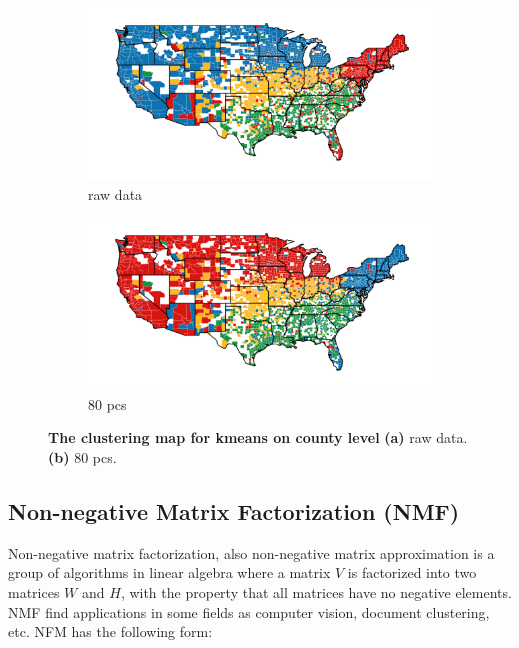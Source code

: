 \begin{figure}[t!]
    \centering
    \begin{subfigure}[t]{0.49\textwidth}
        \includegraphics[width=1.1\textwidth]{fig/kmeans-original-data-4-cluster}
        \caption{raw data}\label{subfig:kmeansOnRawData}
    \end{subfigure}
    \begin{subfigure}[t]{0.49\textwidth}
        \includegraphics[width=1.1\textwidth]{fig/kmeans-reduced-data-4-cluster-80-pc}
        \caption{80 pcs}\label{subfig:kmeansOnReducedData}
    \end{subfigure}
    \caption{\textbf{The clustering map for kmeans on county level}
\textbf{(a)} raw data. \textbf{(b)} 80 pcs.}  \label{fig:kmeansClustering}
\end{figure}


\subsection{Non-negative Matrix Factorization (NMF)}

\qquad Non-negative matrix factorization, also non-negative matrix approximation is a group of 
algorithms in linear algebra where a matrix $V$ is factorized into two matrices $W$ and $H$, 
with the property that all matrices have no negative elements. NMF find applications in 
some fields as computer vision, document clustering, etc. NFM has the following form:

